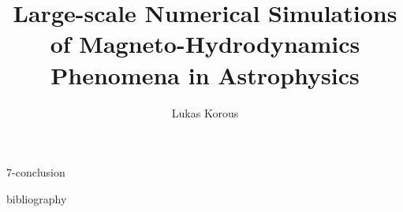 \documentclass[11pt,a4paper,oneside,footinclude=true,headinclude=true]{scrbook}
\title{Large-scale Numerical Simulations of Magneto-Hydrodynamics Phenomena in Astrophysics}
\author{Lukas Korous}
\begin{document}
















 {7-conclusion}

 {bibliography}
		
\end{document}

